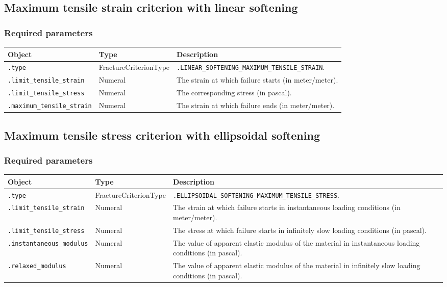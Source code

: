 \documentclass[10pt]{article}
\begin{document}
\subsection{Maximum tensile strain criterion with linear softening}

\subsubsection*{Required parameters}

\begin{tabularx}{\textwidth}{llX}
\hline 
Object & Type & Description \\ 
\hline 
\verb+.type+ & FractureCriterionType & \verb+.LINEAR_SOFTENING_MAXIMUM_TENSILE_STRAIN+. \\ 
\verb+.limit_tensile_strain+ & Numeral & The strain at which failure starts (in meter/meter).\\
\verb+.limit_tensile_stress+ & Numeral & The corresponding stress (in pascal).\\
\verb+.maximum_tensile_strain+ & Numeral & The strain at which failure ends (in meter/meter).\\
\hline 
\end{tabularx}

\subsection{Maximum tensile stress criterion with ellipsoidal softening}

\subsubsection*{Required parameters}

\begin{tabularx}{\textwidth}{llX}
\hline 
Object & Type & Description \\ 
\hline 
\verb+.type+ & FractureCriterionType & \verb+.ELLIPSOIDAL_SOFTENING_MAXIMUM_TENSILE_STRESS+. \\ 
\verb+.limit_tensile_strain+ & Numeral & The strain at which failure starts in instantaneous loading conditions (in meter/meter).\\
\verb+.limit_tensile_stress+ & Numeral & The stress at which failure starts in infinitely slow loading conditions  (in pascal).\\
\verb+.instantaneous_modulus+ & Numeral & The value of apparent elastic modulus of the material in instantaneous loading conditions (in pascal).\\
\verb+.relaxed_modulus+ & Numeral & The value of apparent elastic modulus of the material in infinitely slow loading conditions (in pascal).\\
\hline 
\end{tabularx}
\end{document}
